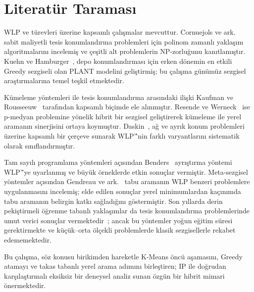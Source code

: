 \documentclass[conference]{IEEEtran}
\begin{document}
\section{Literat\"{u}r Taramas{\i}}
\label{sec:lit}

WLP ve t\"{u}revleri \"{u}zerine kapsaml{\i} \c{c}al{\i}\c{s}malar
mevcuttur.
Cornuejols ve ark.~\cite{cornuejols1977} sabit maliyetli tesis
konumland{\i}rma problemleri i\c{c}in polinom zamanl{\i} yakla\c{s}{\i}m
algoritmalar{\i}n{\i} incelemi\c{s} ve \c{c}e\c{s}itli alt problemlerin
NP-zorlu\u{g}unu kan{\i}tlam{\i}\c{s}t{\i}r.
Kuehn ve Hamburger~\cite{kuehn1963}, depo konumland{\i}rmas{\i} i\c{c}in
erken d\"{o}nemin en etkili Greedy sezgiseli olan PLANT modelini
geli\c{s}tirmi\c{s}; bu \c{c}al{\i}\c{s}ma g\"{u}n\"{u}m\"{u}z
sezgisel ara\c{s}t{\i}rmalar{\i}na temel te\c{s}kil etmektedir.

K\"{u}meleme y\"{o}ntemleri ile tesis konumland{\i}rma aras{\i}ndaki ili\c{s}ki
Kaufman ve Rousseeuw~\cite{kaufman1990} taraf{\i}ndan kapsaml{\i} bi\c{c}imde
ele al{\i}nm{\i}\c{s}t{\i}r.
Resende ve Werneck~\cite{resende2004} ise p-medyan problemine y\"{o}nelik
hibrit bir sezgisel geli\c{s}tirerek k\"{u}meleme ile yerel araman{\i}n
sinerjisini ortaya koymu\c{s}tur.
Daskin~\cite{daskin2011}, a\u{g} ve ayr{\i}k konum problemleri \"{u}zerine
kapsaml{\i} bir \c{c}er\c{c}eve sunarak WLP'\''nin farkl{\i} varyantlar{\i}n{\i}
sistematik olarak s{\i}n{\i}fland{\i}rm{\i}\c{s}t{\i}r.

Tam say{\i}l{\i} programlama y\"{o}ntemleri a\c{c}{\i}s{\i}ndan
Benders~\cite{benders1962} ayr{\i}\c{s}t{\i}rma y\"{o}ntemi WLP'\''ye
uyarlanm{\i}\c{s} ve b\"{u}y\"{u}k \"{o}rneklerde etkin sonu\c{c}lar
vermi\c{s}tir.
Meta-sezgisel y\"{o}ntemler a\c{c}{\i}s{\i}ndan Gendreau ve
ark.~\cite{gendreau1996} tabu araman{\i}n WLP benzeri problemlere
uygulanmas{\i}n{\i} incelemi\c{s}; elde edilen sonu\c{c}lar yerel
minimumlardan ka\c{c}{\i}n{\i}mda tabu araman{\i}n belirgin katk{\i}
sa\u{g}lad{\i}\u{g}{\i}n{\i} g\"{o}stermi\c{s}tir.
Son y{\i}llarda derin pekiştirmeli \"{o}\u{g}renme tabanl{\i} yakla\c{s}{\i}mlar
da tesis konumland{\i}rma problemlerinde umut verici sonu\c{c}lar
vermektedir~\cite{nazari2018}; ancak bu y\"{o}ntemler yo\u{g}un e\u{g}itim
s\"{u}resi gerektirmekte ve k\"{u}\c{c}\"{u}k--orta \"{o}l\c{c}ekli
problemlerde klasik sezgisellerle rekabet edememektedir.

Bu \c{c}al{\i}\c{s}ma, s\"{o}z konusu birikimden hareketle K-Means \"{o}nc\"{u}
a\c{s}amas{\i}n{\i}, Greedy atamay{\i} ve takas tabanl{\i} yerel arama
ad{\i}m{\i}n{\i} birle\c{s}tiren; IP ile do\u{g}rudan kar\c{s}{\i}la\c{s}t{\i}rmal{\i}
eksiksiz bir deneysel analiz sunan \"{o}zg\"{u}n bir hibrit mimari
\"{o}nermektedir.
\end{document}
